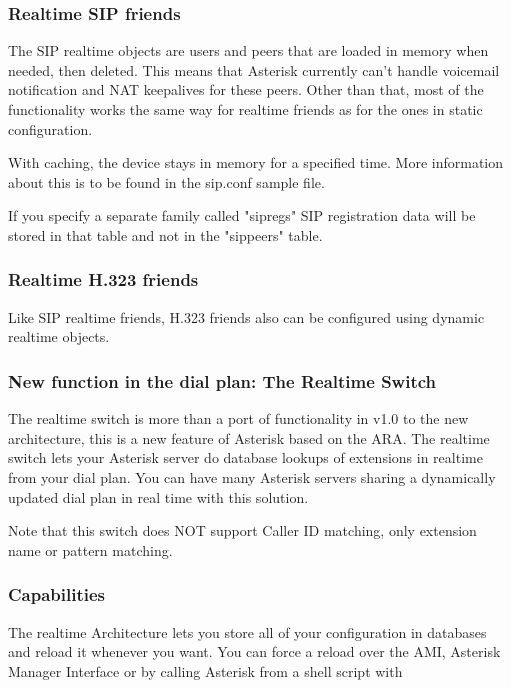 \subsubsection{Realtime SIP friends}

The SIP realtime objects are users and peers that are loaded in memory
when needed, then deleted. This means that Asterisk currently can't handle
voicemail notification and NAT keepalives for these peers. Other than that,
most of the functionality works the same way for realtime friends as for
the ones in static configuration.

With caching, the device stays in memory for a specified time. More
information about this is to be found in the sip.conf sample file.

If you specify a separate family called "sipregs" SIP registration
data will be stored in that table and not in the "sippeers" table.

\subsubsection{Realtime H.323 friends}

Like SIP realtime friends, H.323 friends also can be configured using
dynamic realtime objects.

\subsubsection{New function in the dial plan: The Realtime Switch}

The realtime switch is more than a port of functionality in v1.0 to the
new architecture, this is a new feature of Asterisk based on the
ARA. The realtime switch lets your Asterisk server do database lookups
of extensions in realtime from your dial plan. You can have many Asterisk
servers sharing a dynamically updated dial plan in real time with this
solution.

Note that this switch does NOT support Caller ID matching, only
extension name or pattern matching.

\subsubsection{Capabilities}

The realtime Architecture lets you store all of your configuration in
databases and reload it whenever you want. You can force a reload over
the AMI, Asterisk Manager Interface or by calling Asterisk from a
shell script with

